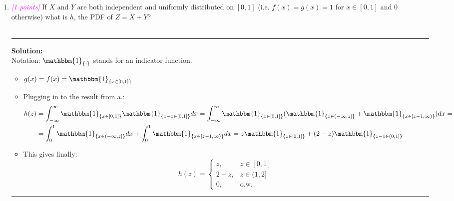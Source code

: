 \documentclass{article}
\newcommand{\1}{\mathbf{1}}
\newcommand{\I}{\mathbbm{1}}
\newcommand{\points}[1]{\small\textcolor{magenta}{\emph{[#1 points]}} \normalsize}
\begin{document}
\begin{enumerate}
	\item \points{1} If $X$ and $Y$ are both independent and uniformly distributed on $[0,1]$ (i.e. $f(x)=g(x)=1$ for $x \in [0,1]$ and $0$ otherwise) what is $h$, the PDF of $Z=X+Y$?
	\\
    \\
    \noindent\rule{\textwidth}{1pt}
    {\bf Solution:}\\
    Notation: $\I_{\{\cdot\}}$ stands for an indicator function.
    \begin{itemize}
        \item $g(x) = f(x) = \I_{ \{x \in [0,1] \} }$
        \item Plugging in to the result from a.: 
        \begin{equation}
        \begin{split}
        h(z)  & = \int_{-\infty}^{\infty}\I_{ \{x \in [0,1] \}}\I_{ \{z-x \in [0,1] \}}dx = \int_{-\infty}^{\infty}\I_{ \{x \in [0,1] \}}(\I_{ \{x \in (-\infty,z] \}}+\I_{ \{x \in [z-1,\infty) \}})dx =\\
        & = \int_0^1\I_{ \{x \in (-\infty,z] \}}dx + \int_0^1 \I_{ \{x \in [z-1,\infty) \}}dx = z\I_{ \{z \in [0,1] \}} + (2-z)\I_{ \{z-1 \in (0,1] \}}
        \end{split}
        \end{equation}
    \item This gives finally:
    $$
    \boxed{
    h(z) = 
    \begin{cases}
    z, &z \in [0,1] \\
    2-z, &z \in (1,2] \\
    0, &\text{o.w.}
    \end{cases}
    }
    $$
    \end{itemize}
    \noindent\rule{\textwidth}{1pt}
\end{enumerate}
\end{document}
